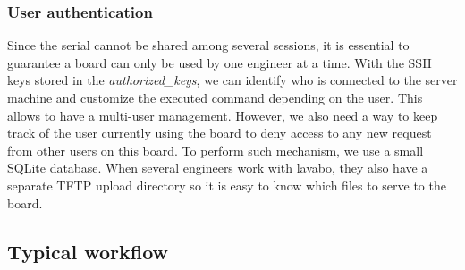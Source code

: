 \subsubsection{User authentication}

Since the serial cannot be shared among several sessions, it is essential to guarantee a board can only be used by one engineer at a time. With the SSH keys stored in the \textit{authorized\_keys}, we can identify who is connected to the server machine and customize the executed command depending on the user. This allows to have a multi-user management. However, we also need a way to keep track of the user currently using the board to deny access to any new request from other users on this board. To perform such mechanism, we use a small SQLite database. When several engineers work with lavabo, they also have a separate TFTP upload directory so it is easy to know which files to serve to the board.

\subsection{Typical workflow}


